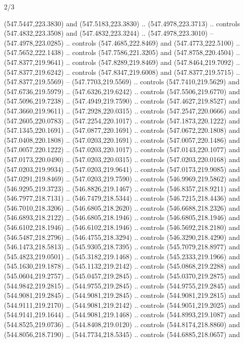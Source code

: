 \begin{flagdescription}{2/3}
\begin{scope}[xshift=0.5\flaglength,yshift=0.5\flagwidth,scale=\flagwidth/495.65]
\begin{scope}[y=0.8pt, x=0.8pt, yscale=-1,shift={(-463.76,-309.78)}]
  (547.5447,223.3830) and (547.5183,223.3830) .. (547.4978,223.3713) .. controls
  (547.4832,223.3508) and (547.4832,223.3244) .. (547.4978,223.3010) --
  (547.4978,223.0285) .. controls (547.4685,222.8469) and (547.4773,222.5100) ..
  (547.5652,222.1438) .. controls (547.7586,221.3205) and (547.8758,220.4504) ..
  (547.8377,219.9641) .. controls (547.8289,219.8469) and (547.8464,219.7092) ..
  (547.8377,219.6242) .. controls (547.8347,219.6008) and (547.8377,219.5715) ..
  (547.8377,219.5569) -- (547.7703,219.5569) .. controls (547.7410,219.5629) and
  (547.6736,219.5979) .. (547.6326,219.6242) .. controls (547.5506,219.6770) and
  (547.5096,219.7238) .. (547.4949,219.7590) .. controls (547.4627,219.8527) and
  (547.3660,219.9611) .. (547.2928,220.0315) .. controls (547.2547,220.0666) and
  (547.2605,220.0783) .. (547.2254,220.1017) .. controls (547.1873,220.1222) and
  (547.1345,220.1691) .. (547.0877,220.1691) .. controls (547.0672,220.1808) and
  (547.0408,220.1808) .. (547.0203,220.1691) .. controls (547.0057,220.1486) and
  (547.0057,220.1222) .. (547.0203,220.1017) .. controls (547.0143,220.1077) and
  (547.0173,220.0490) .. (547.0203,220.0315) .. controls (547.0203,220.0168) and
  (547.0203,219.9934) .. (547.0203,219.9641) .. controls (547.0173,219.9085) and
  (547.0291,219.8469) .. (547.0203,219.7590) .. controls (546.9969,219.5862) and
  (546.9295,219.3723) .. (546.8826,219.1467) .. controls (546.8357,218.9211) and
  (546.7977,218.7131) .. (546.7479,218.5344) .. controls (546.7215,218.4436) and
  (546.7010,218.3206) .. (546.6805,218.2620) .. controls (546.6688,218.2326) and
  (546.6893,218.2122) .. (546.6805,218.1946) .. controls (546.6805,218.1946) and
  (546.6102,218.1946) .. (546.6102,218.1946) .. controls (546.5692,218.2180) and
  (546.5487,218.2796) .. (546.4755,218.3294) .. controls (546.3290,218.4290) and
  (546.1473,218.5813) .. (545.9305,218.7395) .. controls (545.7079,218.8977) and
  (545.4823,219.0501) .. (545.3182,219.1468) .. controls (545.2333,219.1966) and
  (545.1630,219.1878) .. (545.1132,219.2142) .. controls (545.0868,219.2288) and
  (545.0604,219.2757) .. (545.0457,219.2845) .. controls (545.0370,219.2875) and
  (544.9842,219.2815) .. (544.9755,219.2845) .. controls (544.9755,219.2845) and
  (544.9081,219.2845) .. (544.9081,219.2845) .. controls (544.9081,219.2815) and
  (544.9111,219.2170) .. (544.9081,219.2142) .. controls (544.9051,219.2025) and
  (544.9141,219.1644) .. (544.9081,219.1468) .. controls (544.8993,219.1087) and
  (544.8525,219.0736) .. (544.8408,219.0120) .. controls (544.8174,218.8860) and
  (544.8056,218.7190) .. (544.7734,218.5345) .. controls (544.6885,218.0657) and

\end{scope}
\end{scope}
\end{flagdescription}
